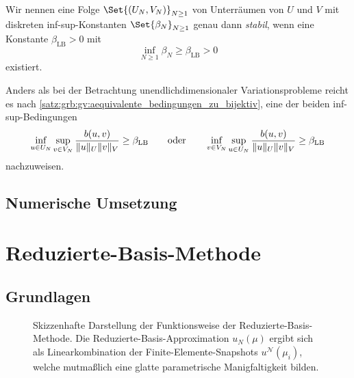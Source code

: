 \begin{Definition}
\label{def:grb:gv:stabile_diskretisierung}
    Wir nennen eine Folge $\Set{(U_{N}, V_{N})}_{N \geq 1}$ von Unterräumen von $U$ und $V$ mit diskreten inf-sup-Konstanten $\Set{\beta_{N}}_{N \geq 1}$ genau dann \emph{stabil}, wenn eine Konstante $\beta_{\mathrm{LB}} > 0$ mit
    \begin{equation}
        \label{eq:grb:gv:stabile_diskretisierung_inf_sup_lower_bound}
        \inf_{N \geq 1} \beta_{N} \geq \beta_{\mathrm{LB}} > 0
    \end{equation}
    existiert.
\end{Definition}

Anders als bei der Betrachtung unendlichdimensionaler Variationsprobleme reicht es nach \cref{satz:grb:gv:aequivalente_bedingungen_zu_bijektiv}, eine der beiden inf-sup-Bedingungen
\begin{equation}
    \inf_{u \in U_{N}} \sup_{v \in V_{N}} \frac{b(u, v)}{\lVert u\rVert_{U} \lVert v\rVert_{V}}
    \geq \beta_{\mathrm{LB}}
    \qquad \text{oder} \qquad
     \inf_{v \in V_{N}} \sup_{u \in U_{N}} \frac{b(u, v)}{\lVert u\rVert_{U} \lVert v\rVert_{V}}
    \geq \beta_{\mathrm{LB}}
\end{equation}
nachzuweisen.



\subsection{Numerische Umsetzung} %
\label{sub:grb:gv:numerische_umsetzung}




\section{Reduzierte-Basis-Methode} %
\label{sec:grb:rb:reduzierte_basis_methode}

\subsection{Grundlagen} %
\label{sub:grb:rb:grundlagen}

\begin{figure}[tb]
    \centering
    
    \caption[%
    Skizzenhafte Darstellung der Funktionsweise der Reduzierte-Basis-Methode.
    ]{
        Skizzenhafte Darstellung der Funktionsweise der Reduzierte-Basis-Methode.
        Die Reduzierte-Basis-Approximation $u_{N}(\mu)$ ergibt sich als Linearkombination der Finite-Elemente-Snapshots $u^{\mathcal N}(\mu_{i})$, welche mutmaßlich eine glatte parametrische Manigfaltigkeit bilden.
        }
    \label{fig:figure1}
\end{figure}


